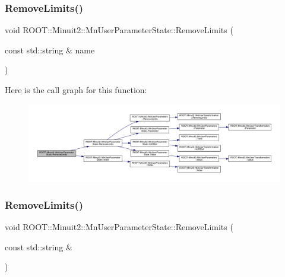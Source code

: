 \subsubsection{\texorpdfstring{RemoveLimits()}{RemoveLimits()}\hspace{0.1cm}{\footnotesize\ttfamily [3/4]}}
{\footnotesize\ttfamily void R\+O\+O\+T\+::\+Minuit2\+::\+Mn\+User\+Parameter\+State\+::\+Remove\+Limits (\begin{DoxyParamCaption}\item[{const std\+::string \&}]{name }\end{DoxyParamCaption})}

Here is the call graph for this function\+:\nopagebreak
\begin{figure}[H]
\begin{center}
\leavevmode
\includegraphics[width=350pt]{d3/de0/classROOT_1_1Minuit2_1_1MnUserParameterState_ac71dfd669559be76ed62fdf221a017d5_cgraph}
\end{center}
\end{figure}
\mbox{\label{classROOT_1_1Minuit2_1_1MnUserParameterState_ac71dfd669559be76ed62fdf221a017d5}} 
\subsubsection{\texorpdfstring{RemoveLimits()}{RemoveLimits()}\hspace{0.1cm}{\footnotesize\ttfamily [4/4]}}
{\footnotesize\ttfamily void R\+O\+O\+T\+::\+Minuit2\+::\+Mn\+User\+Parameter\+State\+::\+Remove\+Limits (\begin{DoxyParamCaption}\item[{const std\+::string \&}]{ }\end{DoxyParamCaption})}

\mbox{\label{classROOT_1_1Minuit2_1_1MnUserParameterState_adf2a80e9887b97dcc01b65184281aaa5}} 
